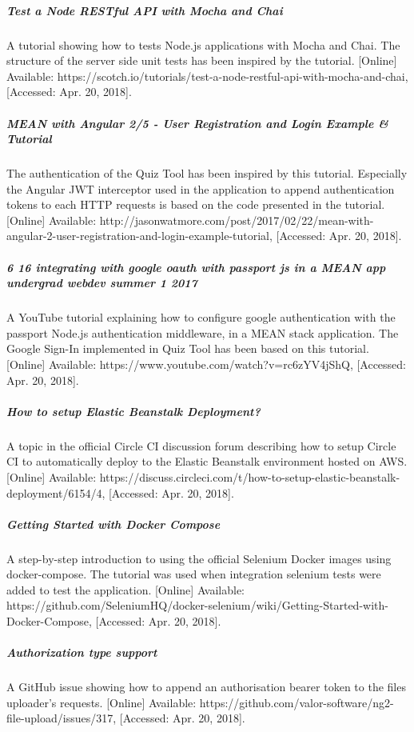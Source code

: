 \subparagraph{Test a Node RESTful API with Mocha and Chai}
A tutorial showing how to tests Node.js applications with Mocha and Chai. The structure of the server side
unit tests has been inspired by the tutorial. [Online] Available: https://scotch.io/tutorials/test-a-node-restful-api-with-mocha-and-chai,
[Accessed: Apr. 20, 2018].

\subparagraph{MEAN with Angular 2/5 - User Registration and Login Example \& Tutorial}
The authentication of the Quiz Tool has been inspired by this tutorial. Especially the Angular
JWT interceptor used in the application to append authentication tokens to each HTTP requests is based on the
code presented in the tutorial. [Online] Available: http://jasonwatmore.com/post/2017/02/22/mean-with-angular-2-user-registration-and-login-example-tutorial,
[Accessed: Apr. 20, 2018].

\subparagraph{6 16 integrating with google oauth with passport js in a MEAN app undergrad webdev summer 1 2017}
A YouTube tutorial explaining how to configure google authentication with the passport Node.js
authentication middleware, in a MEAN stack application. The Google Sign-In implemented in Quiz Tool
has been based on this tutorial. [Online] Available: https://www.youtube.com/watch?v=rc6zYV4jShQ,
[Accessed: Apr. 20, 2018].

\subparagraph{How to setup Elastic Beanstalk Deployment?}
A topic in the official Circle CI discussion forum describing how to setup Circle CI to automatically
deploy to the Elastic Beanstalk environment hosted on AWS. [Online] Available: https://discuss.circleci.com/t/how-to-setup-elastic-beanstalk-deployment/6154/4,
[Accessed: Apr. 20, 2018].

\subparagraph{Getting Started with Docker Compose}
A step-by-step introduction to using the official Selenium Docker images using docker-compose. The tutorial
was used when integration selenium tests were added to test the application.
[Online] Available: https://github.com/SeleniumHQ/docker-selenium/wiki/Getting-Started-with-Docker-Compose,
[Accessed: Apr. 20, 2018].

\subparagraph{Authorization type support}
A GitHub issue showing how to append an authorisation bearer token to the files uploader's requests.
[Online] Available: https://github.com/valor-software/ng2-file-upload/issues/317,
[Accessed: Apr. 20, 2018].











%
